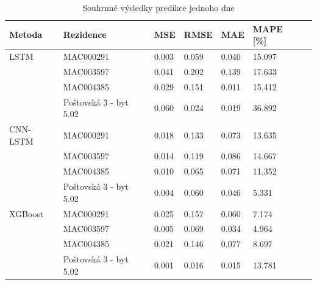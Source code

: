 \documentclass[FM,BP,fonts]{tulthesis}
\begin{document}
\begin{table}[!ht]
	\centering
	\caption{Souhrnné výsledky predikce jednoho dne}
	\label{Tab:1dayresults}
	\def\arraystretch{1.2}
	\begin{tabular}{lllllll}
		\hline
		\textbf{Metoda} & \textbf{Rezidence} & \textbf{MSE} & \textbf{RMSE} & \textbf{MAE} & \textbf{MAPE [\%]} \\      \hline
		LSTM            & MAC000291          & 0.003          & 0.059          & 0.040           & 15.097              \\ 
		~               & MAC003597          & 0.041            & 0.202             & 0.139            &  17.633             \\  
		~               & MAC004385          & 0.029            & 0.151             &  0.011           & 15.412            \\ 
		~               & Poštovská 3 - byt 5.02              & 0.060            & 0.024             & 0.019           & 36.892 \\         
		
		\hline
		
		CNN-LSTM        & MAC000291          & 0.018               & 0.133               & 0.073           & 13.635              \\ 
		~               & MAC003597          & 0.014            & 0.119             & 0.086            & 14.667             \\  
		~               & MAC004385          & 0.010            & 0.065             & 0.071           & 11.352            \\ 
		~               & Poštovská 3 - byt 5.02              & 0.004            & 0.060             & 0.046           & 5.331 \\         
		
		\hline
		
		
		XGBoost         & MAC000291          & 0.025	       & 0.157             &  0.060        &  7.174            \\ 
		~               & MAC003597          & 0.005            & 0.069             & 0.034            & 4.964             \\  
		~               & MAC004385          & 0.021            & 0.146             &  0.077            &  8.697             \\ 
		~               & Poštovská 3 - byt 5.02  & 0.001           & 0.016             & 0.015            & 13.781\\   
		
		\hline
		

\end{tabular}
\end{table}
\end{document}
